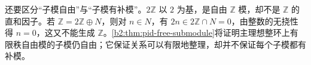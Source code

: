 \ProseParagraphBreak
还要区分“子模自由”与“子模有补模”。\(2\mathbb Z\) 以 \(2\) 为基，是自由 \(\mathbb Z\) 模，却不是 \(\mathbb Z\) 的直和因子。若 \(\mathbb Z=2\mathbb Z\oplus N\)，则对 \(n\in N\)，有 \(2n\in2\mathbb Z\cap N=0\)，由整数的无挠性得 \(n=0\)，这又不能生成 \(\mathbb Z\)。\cref{b2:thm:pid-free-submodule}将证明主理想整环上有限秩自由模的子模仍自由；它保证关系可以有限地整理，却并不保证每个子模都有补模。
